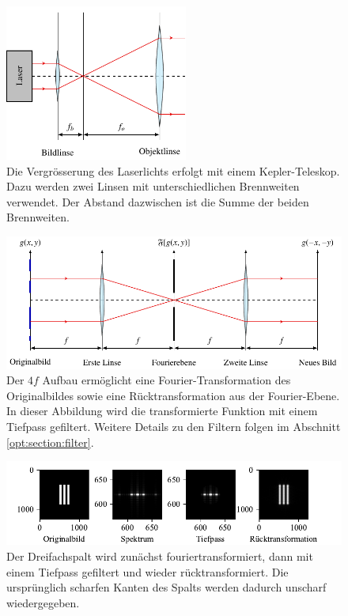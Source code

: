 \begin{figure}
    \centering
    \includegraphics[width=60mm]{papers/opt/images/laserAufweiten.pdf}
    \caption{Die Vergrösserung des Laserlichts erfolgt mit einem Kepler-Teleskop.
        Dazu werden zwei Linsen mit unterschiedlichen Brennweiten verwendet.
        Der Abstand dazwischen ist die Summe der beiden Brennweiten.}
    \label{opt:fig:laserAufweiten}
\end{figure}

\begin{figure}
    \centering
    \includegraphics[width=\textwidth]{papers/opt/images/4fAufbau.pdf}
    \caption{Der $4f$ Aufbau ermöglicht eine Fourier-Transformation des Originalbildes sowie eine Rücktransformation aus der Fourier-Ebene.
    In dieser Abbildung wird die transformierte Funktion mit einem Tiefpass gefiltert.
    Weitere Details zu den Filtern folgen im Abschnitt \ref{opt:section:filter}.}
    \label{opt:fig:4fAufbau}
\end{figure}

\begin{figure}
    \centering
    \includegraphics[width=\textwidth]{papers/opt/images/dreifachspalt_tiefpass.pdf}
    \caption{Der Dreifachspalt wird zunächst fouriertransformiert, dann mit einem Tiefpass gefiltert und wieder rücktransformiert.
    Die ursprünglich scharfen Kanten des Spalts werden dadurch unscharf wiedergegeben.}
    \label{opt:fig:three_slit_simulation}
\end{figure}

